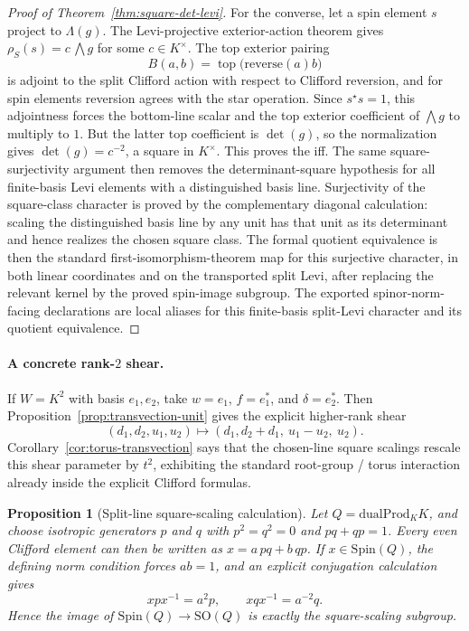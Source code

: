 \documentclass[11pt,a4paper]{article}
\theoremstyle{plain}
\newtheorem{proposition}[theorem]{Proposition}
\theoremstyle{definition}
\theoremstyle{remark}
\newcommand{\Spin}{\mathrm{Spin}}
\newcommand{\SO}{\mathrm{SO}}
\newcommand{\dualProd}{\mathrm{dualProd}}
\begin{document}
\begin{proof}[Proof of Theorem~\ref{thm:square-det-levi}]
For the converse, let a spin element \(s\) project to \(\Lambda(g)\). The
Levi-projective exterior-action theorem gives
\(\rho_S(s)=c\,\bigwedge g\) for some \(c\in K^\times\). The top exterior
pairing
\[
  B(a,b)=\operatorname{top}\bigl(\mathrm{reverse}(a)b\bigr)
\]
is adjoint to the split Clifford action with respect to Clifford reversion, and
for spin elements reversion agrees with the star operation. Since \(s^\star s=1\),
this adjointness forces the bottom-line scalar and the top exterior coefficient
of \(\bigwedge g\) to multiply to \(1\). But the latter top coefficient is
\(\det(g)\), so the normalization gives \(\det(g)=c^{-2}\), a square in
\(K^\times\). This proves the iff. The same square-surjectivity argument then
removes the determinant-square hypothesis for all finite-basis Levi elements
with a distinguished basis line. Surjectivity of the square-class character is
proved by the complementary diagonal calculation: scaling the distinguished
basis line by any unit has that unit as its determinant and hence realizes the
chosen square class. The formal quotient equivalence is then the standard
first-isomorphism-theorem map for this surjective character, in both linear coordinates and on
the transported split Levi, after replacing the relevant kernel by the proved spin-image subgroup.
The exported spinor-norm-facing declarations are local aliases for this
finite-basis split-Levi character and its quotient equivalence.
\end{proof}

\paragraph{A concrete rank-$2$ shear.}
If $W=K^2$ with basis $e_1,e_2$, take $w=e_1$, $f=e_1^*$, and
$\delta=e_2^*$. Then Proposition~\ref{prop:transvection-unit} gives the
explicit higher-rank shear
\[
  (d_1,d_2,u_1,u_2)\longmapsto (d_1,d_2+d_1,\ u_1-u_2,\ u_2).
\]
Corollary~\ref{cor:torus-transvection} says that the chosen-line square
scalings rescale this shear parameter by $t^2$, exhibiting the standard
root-group / torus interaction already inside the explicit Clifford formulas.

\begin{proposition}[Split-line square-scaling calculation]
\label{prop:split-line-square}
Let $Q=\dualProd_K K$, and choose isotropic generators $p$ and $q$ with
\(p^2=q^2=0\) and \(pq+qp=1\). Every even Clifford element can then be written
as \(x=a\,pq+b\,qp\). If \(x\in \Spin(Q)\), the defining norm condition forces
\(ab=1\), and an explicit conjugation calculation gives
\[
  x p x^{-1}=a^2 p,
  \qquad
  x q x^{-1}=a^{-2} q.
\]
Hence the image of $\Spin(Q)\to \SO(Q)$ is exactly the square-scaling subgroup.
\end{proposition}
\end{document}
